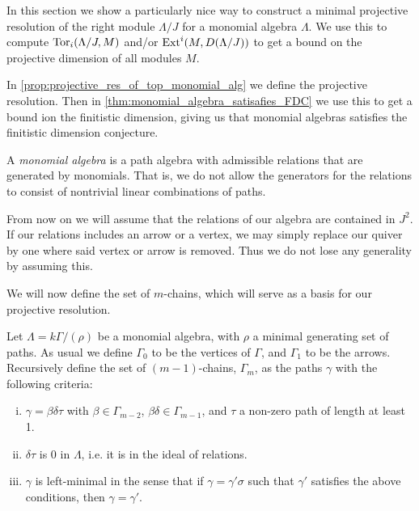 
In this section we show a particularly nice way to construct a minimal projective resolution of the right module $\Lambda / J$ for a monomial algebra $\Lambda$. We use this to compute $\operatorname{Tor}_i(\Lambda /J, M)$ and/or $\operatorname{Ext}^i(M, D(\Lambda/J))$ to get a bound on the projective dimension of all modules $M$.

In \cref{prop:projective_res_of_top_monomial_alg} we define the projective resolution. Then in \cref{thm:monomial_algebra_satisafies_FDC} we use this to get a bound ion the finitistic dimension, giving us that monomial algebras satisfies the finitistic dimension conjecture.

\begin{defn}
	A \emph{monomial algebra} is a path algebra with admissible relations that are generated by monomials. That is, we do not allow the generators for the relations to consist of nontrivial linear combinations of paths.
\end{defn}

From now on we will assume that the relations of our algebra are contained in $J^2$. If our relations includes an arrow or a vertex, we may simply replace our quiver by one where said vertex or arrow is removed. Thus we do not lose any generality by assuming this.

We will now define the set of $m$-chains, which will serve as a basis for our projective resolution.

\begin{defn}[$m$-chains]\cite{GKK91}
	Let $\Lambda = k\Gamma / (\rho)$ be a monomial algebra, with $\rho$ a minimal generating set of paths. As usual we define $\Gamma_0$ to be the vertices of $\Gamma$, and $\Gamma_1$ to be the arrows. Recursively define the set of $(m-1)$-chains, $\Gamma_m$, as the paths $\gamma$ with the following criteria:
	\begin{enumerate}[i)]
		\item $\gamma = \beta\delta\tau$ with $\beta \in \Gamma_{m-2}$, $\beta\delta \in \Gamma_{m-1}$, and $\tau$ a non-zero path of length at least 1.
		\item $\delta\tau$ is 0 in $\Lambda$, i.e. it is in the ideal of relations.
		\item $\gamma$ is left-minimal in the sense that if $\gamma = \gamma' \sigma$ such that $\gamma'$ satisfies the above conditions, then $\gamma = \gamma'$.
	\end{enumerate}
\end{defn}

